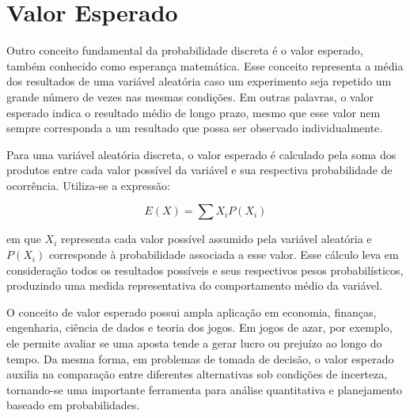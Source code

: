 \section{Valor Esperado}
\label{sec:valorEsperado}

Outro conceito fundamental da probabilidade discreta é o valor esperado, também conhecido como esperança matemática. Esse conceito representa a média dos resultados de uma variável aleatória caso um experimento seja repetido um grande número de vezes nas mesmas condições. Em outras palavras, o valor esperado indica o resultado médio de longo prazo, mesmo que esse valor nem sempre corresponda a um resultado que possa ser observado individualmente.

Para uma variável aleatória discreta, o valor esperado é calculado pela soma dos produtos entre cada valor possível da variável e sua respectiva probabilidade de ocorrência. Utiliza-se a expressão:

\begin{equation}
    E(X) = \sum X_i P(X_i)
    \label{eq:valor_esperado}
\end{equation}

em que $X_i$ representa cada valor possível assumido pela variável aleatória e $P(X_i)$ corresponde à probabilidade associada a esse valor. Esse cálculo leva em consideração todos os resultados possíveis e seus respectivos pesos probabilísticos, produzindo uma medida representativa do comportamento médio da variável.

O conceito de valor esperado possui ampla aplicação em economia, finanças, engenharia, ciência de dados e teoria dos jogos. Em jogos de azar, por exemplo, ele permite avaliar se uma aposta tende a gerar lucro ou prejuízo ao longo do tempo. Da mesma forma, em problemas de tomada de decisão, o valor esperado auxilia na comparação entre diferentes alternativas sob condições de incerteza, tornando-se uma importante ferramenta para análise quantitativa e planejamento baseado em probabilidades.



